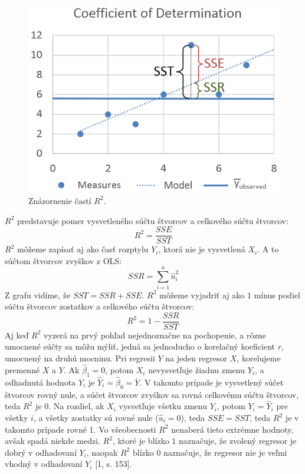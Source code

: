 \documentclass[]{tukediphc}
\begin{document}
\begin{figure}[!ht]
    \centering
    \includegraphics[scale = 0.5]{diplomka obrazky/11.png}
    \caption{Znázornenie častí $R^2$.}
\end{figure}
$R^2$ predstavuje pomer vysvetleného súčtu štvorcov a celkového súčtu štvorcov:
\begin{equation}
    R^2 = \frac{SSE}{SST}
\end{equation}
$R^2$ môžeme zapísať aj ako časť rozptylu $Y_i$, ktorá nie je vysvetlená $X_i$. A to súčtom štvorcov zvyškov z OLS: 
\begin{equation}
    SSR = \sum_{i=1}^{n}\hat{u}_{i}^2
\end{equation}
Z grafu vidíme, že $SST = SSR + SSE$. $R^2$ môžeme vyjadriť aj ako $1$ mínus podiel súčtu štvorcov zostatkov a celkového súčtu štvorcov: 
\begin{equation}
    R^2 = 1 - \frac{SSR}{SST}
\end{equation}
Aj keď $R^2$ vyzerá na prvý pohľad nejednoznačne na pochopenie, a rôzne umocnené súčty sa môžu mýliť, jedná sa jednoducho o korelačný koeficient $r$, umocnený na druhú mocninu. Pri regresii $Y$ na jeden regresor $X$, korelujeme premenné $X$ a $Y$. Ak $\hat\beta_1 = 0$, potom $X_i$ nevysvetľuje žiadnu zmenu $Y_i$, a odhadnutá hodnota $Y_i$ je $\hat{Y}_{i} = \hat\beta_0  = {\overline{Y}}$. V takomto prípade je vysvetlený súčet štvorcov rovný nule, a súčet štvorcov zvyškov sa rovná celkovému súčtu štvorcov, teda $R^2$ je 0. Na rozdiel, ak $X_i$ vysvetľuje všetku zmenu $Y_i$, potom $Y_i = \hat{Y}_{i}$ pre všetky $i$, a všetky zostatky sú rovné nule ($\hat{u}_{i} = 0$), teda $SSE = SST$, teda $R^2$ je v takomto prípade rovné 1. Vo všeobecnosti $R^2$ nenaberá tieto extrémne hodnoty, avšak spadá niekde medzi. $R^2$, ktoré je blízko $1$ naznačuje, že zvolený regresor je dobrý v odhadovaní $Y_i$, naopak $R^2$ blízko 0 naznačuje, že regresor nie je veľmi vhodný v odhadovaní $Y_i$ [1, s. 153]. 
\end{document}
